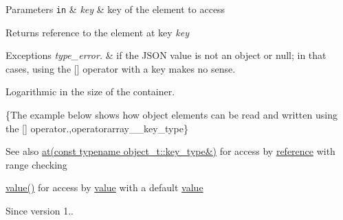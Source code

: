 \begin{DoxyParams}[1]{Parameters}
\mbox{\tt in}  & {\em key} & key of the element to access\\
\hline
\end{DoxyParams}
\begin{DoxyReturn}{Returns}
reference to the element at key {\itshape key} 
\end{DoxyReturn}

\begin{DoxyExceptions}{Exceptions}
{\em type\+\_\+error.} & if the J\+S\+ON value is not an object or null; in that cases, using the \mbox{[}\mbox{]} operator with a key makes no sense.\\
\hline
\end{DoxyExceptions}
Logarithmic in the size of the container.

\{The example below shows how object elements can be read and written using the {\ttfamily \mbox{[}\mbox{]}} operator.,operatorarray\+\_\+\+\_\+key\+\_\+type\}

\begin{DoxySeeAlso}{See also}
\hyperlink{classnlohmann_1_1basic__json_a93403e803947b86f4da2d1fb3345cf2c}{at(const typename object\+\_\+t\+::key\+\_\+type\&)} for access by \hyperlink{classnlohmann_1_1basic__json_ac6a5eddd156c776ac75ff54cfe54a5bc}{reference} with range checking 

\hyperlink{classnlohmann_1_1basic__json_a404017aa52714a0a4bc79d5af7e4ad2b}{value()} for access by \hyperlink{classnlohmann_1_1basic__json_a404017aa52714a0a4bc79d5af7e4ad2b}{value} with a default \hyperlink{classnlohmann_1_1basic__json_a404017aa52714a0a4bc79d5af7e4ad2b}{value}
\end{DoxySeeAlso}
\begin{DoxySince}{Since}
version 1.. 
\end{DoxySince}

